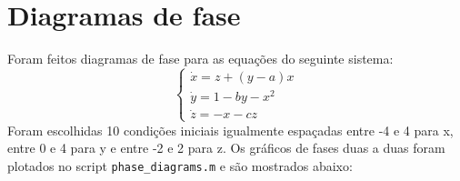 \documentclass[12pt]{article}
\begin{document}
\section{Diagramas de fase}
Foram feitos diagramas de fase para as equações do seguinte sistema:
\begin{equation}
    \left\{
        \begin{array}{l}
          \dot{x} = z + (y - a)x\\
          \dot{y} = 1 - by - x^2\\
          \dot{z} = -x - cz
        \end{array}
      \right.
\end{equation}
Foram escolhidas 10 condições iniciais igualmente espaçadas entre -4 e 4 para x, entre 0 e 4 para y e entre -2 e 2 para z. Os gráficos de fases duas a duas foram plotados no script \texttt{phase\_diagrams.m} e são mostrados abaixo:
\end{document}
